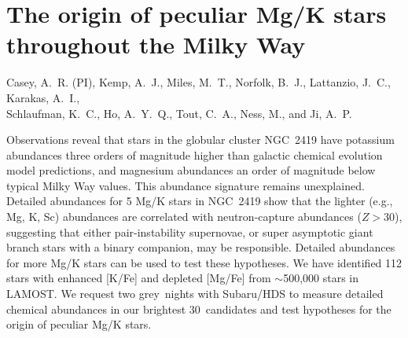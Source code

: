 \documentclass[12pt]{report}
\newcommand{\NumStars}{30}
\newcommand{\NumNights}{two grey}
\begin{document}
\section*{The origin of peculiar Mg/K stars throughout the Milky Way}\vspace{-\parskip}

\begin{center}
Casey, A.~R. (PI), Kemp, A.~J., Miles, M.~T., Norfolk, B.~J., Lattanzio, J.~C., Karakas, A.~I.,\\ Schlaufman, K.~C., Ho, A.~Y.~Q., Tout, C.~A., Ness, M., and Ji, A.~P.
\end{center}

\newcommand{\refnum}[1]{[#1]}

\begin{highlightbox}
Observations reveal that stars in the globular cluster NGC~2419 have potassium abundances three orders of magnitude higher than galactic chemical evolution model predictions, and magnesium abundances an order of magnitude below typical Milky Way values. This abundance signature remains unexplained. Detailed abundances for 5 Mg/K stars in NGC~2419 show that the lighter (e.g., Mg, K, Sc) abundances are correlated with neutron-capture abundances ($Z > 30$), suggesting that either pair-instability supernovae, or super asymptotic giant branch stars with a binary companion, may be responsible. Detailed abundances for more Mg/K stars can be used to test these hypotheses. We have identified 112 stars with  enhanced [K/Fe] and depleted [Mg/Fe] from $\sim$500,000 stars in LAMOST. We request \NumNights\ nights with Subaru/HDS to measure detailed chemical abundances in our brightest \NumStars\ candidates and test hypotheses for the origin of peculiar Mg/K stars.
\end{highlightbox}\vspace{-\parskip}
\end{document}
